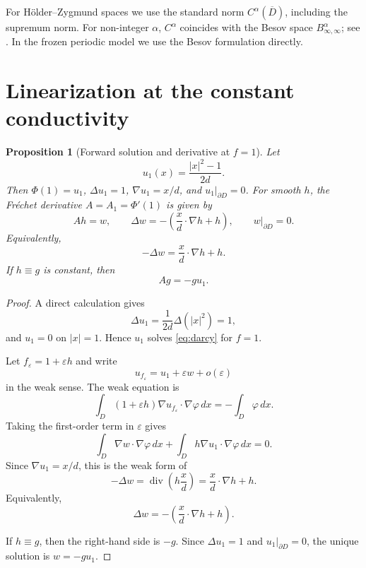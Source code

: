 \documentclass[12pt]{article}
\newtheorem{proposition}[theorem]{Proposition}
\theoremstyle{remark}
\DeclareMathOperator{\divg}{div}
\begin{document}
For H\"older--Zygmund spaces we use the standard norm \(C^\alpha(\overline D)\), including the supremum norm. For non-integer \(\alpha\), \(C^\alpha\) coincides with the Besov space \(B^\alpha_{\infty,\infty}\); see \cite{Triebel}. In the frozen periodic model we use the Besov formulation directly.

\section{Linearization at the constant conductivity}
\label{sec:linearization}

\begin{proposition}[Forward solution and derivative at \(f=1\)]
\label{prop:linearization-one}
Let
\[
u_1(x)=\frac{|x|^2-1}{2d}.
\]
Then \(\Phi(1)=u_1\), \(\Delta u_1=1\), \(\nabla u_1=x/d\), and \(u_1|_{\partial D}=0\). For smooth \(h\), the Fr\'echet derivative \(A=A_1=\Phi'(1)\) is given by
\[
Ah=w,
\qquad
\Delta w=-\left(\frac{x}{d}\cdot\nabla h+h\right),
\qquad
w|_{\partial D}=0.
\]
Equivalently,
\[
-\Delta w=\frac{x}{d}\cdot\nabla h+h.
\]
If \(h\equiv g\) is constant, then
\[
Ag=-g u_1.
\]
\end{proposition}
\begin{proof}
A direct calculation gives
\[
\Delta u_1=\frac{1}{2d}\Delta(|x|^2)=1,
\]
and \(u_1=0\) on \(|x|=1\). Hence \(u_1\) solves \eqref{eq:darcy} for \(f=1\).

Let \(f_\varepsilon=1+\varepsilon h\) and write
\[
u_{f_\varepsilon}=u_1+\varepsilon w+o(\varepsilon)
\]
in the weak sense. The weak equation is
\[
\int_D (1+\varepsilon h)\nabla u_{f_\varepsilon}\cdot\nabla\varphi\,dx
=
-\int_D\varphi\,dx.
\]
Taking the first-order term in \(\varepsilon\) gives
\[
\int_D \nabla w\cdot\nabla\varphi\,dx
+
\int_D h\nabla u_1\cdot\nabla\varphi\,dx
=0.
\]
Since \(\nabla u_1=x/d\), this is the weak form of
\[
-\Delta w=\divg\left(h\frac{x}{d}\right)
=
\frac{x}{d}\cdot\nabla h+h.
\]
Equivalently,
\[
\Delta w=-\left(\frac{x}{d}\cdot\nabla h+h\right).
\]

If \(h\equiv g\), then the right-hand side is \(-g\). Since \(\Delta u_1=1\) and \(u_1|_{\partial D}=0\), the unique solution is \(w=-g u_1\).
\end{proof}
\end{document}
